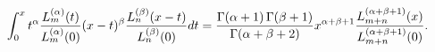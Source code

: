 \[\int_{0}^{x}t^{\alpha}\frac{\mathop{L^{(\alpha)}_{m}\/}\nolimits\!\left(t%
\right)}{\mathop{L^{(\alpha)}_{m}\/}\nolimits\!\left(0\right)}(x-t)^{\beta}%
\frac{\mathop{L^{(\beta)}_{n}\/}\nolimits\!\left(x-t\right)}{\mathop{L^{(\beta%
)}_{n}\/}\nolimits\!\left(0\right)}dt=\frac{\mathop{\Gamma\/}\nolimits\!\left(%
\alpha+1\right)\mathop{\Gamma\/}\nolimits\!\left(\beta+1\right)}{\mathop{%
\Gamma\/}\nolimits\!\left(\alpha+\beta+2\right)}x^{\alpha+\beta+1}\frac{%
\mathop{L^{(\alpha+\beta+1)}_{m+n}\/}\nolimits\!\left(x\right)}{\mathop{L^{(%
\alpha+\beta+1)}_{m+n}\/}\nolimits\!\left(0\right)}.\]